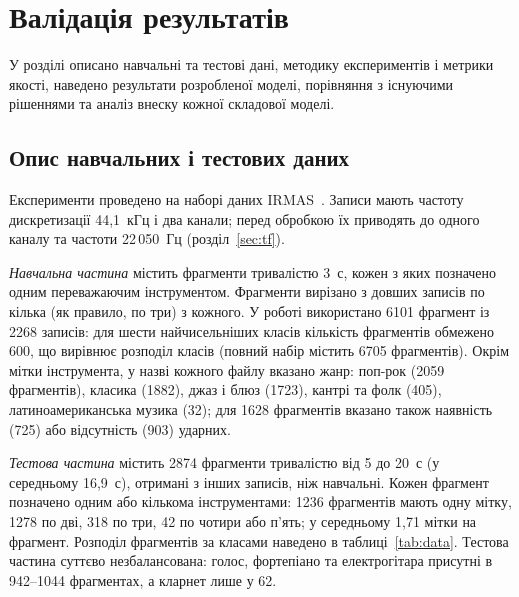 
\chapter{Валідація результатів}
\label{chap:validation}

У розділі описано навчальні та тестові дані, методику експериментів і
метрики якості, наведено результати розробленої моделі, порівняння з
існуючими рішеннями та аналіз внеску кожної складової моделі.

\section{Опис навчальних і тестових даних}
\label{sec:data}

Експерименти проведено на наборі даних IRMAS~\cite{irmas2012}. Записи
мають частоту дискретизації 44,1~кГц і два канали; перед обробкою їх
приводять до одного каналу та частоти 22\,050~Гц
(розділ~\ref{sec:tf}).

\textit{Навчальна частина} містить фрагменти тривалістю 3~с, кожен з
яких позначено одним переважаючим інструментом. Фрагменти вирізано з
довших записів по кілька (як правило, по три) з кожного. У роботі
використано 6101 фрагмент із 2268 записів: для шести найчисельніших
класів кількість фрагментів обмежено 600, що вирівнює розподіл класів
(повний набір містить 6705 фрагментів). Окрім мітки інструмента, у назві
кожного файлу вказано жанр: поп-рок (2059 фрагментів), класика (1882),
джаз і блюз (1723), кантрі та фолк (405), латиноамериканська музика
(32); для 1628 фрагментів вказано також наявність (725) або відсутність
(903) ударних.

\textit{Тестова частина} містить 2874 фрагменти тривалістю від 5 до
20~с (у середньому 16,9~с), отримані з інших записів, ніж навчальні. Кожен
фрагмент позначено одним або кількома інструментами: 1236 фрагментів
мають одну мітку, 1278 по дві, 318 по три, 42 по чотири або п'ять; у
середньому 1,71 мітки на фрагмент. Розподіл фрагментів за класами
наведено в таблиці~\ref{tab:data}. Тестова частина суттєво
незбалансована: голос, фортепіано та електрогітара присутні в 942--1044
фрагментах, а кларнет лише у 62.

